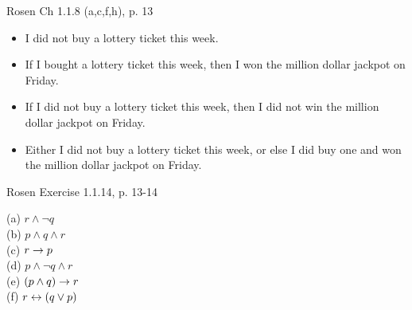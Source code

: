 \begin{questions}
  Rosen Ch 1.1.8 (a,c,f,h), p. 13 
    \ifprintanswers
        \vspace{-10pt}
    \fi
    \begin{solution}
        \begin{itemize}[itemsep=0pt,parsep=0pt,
        topsep=0pt,partopsep=0pt]
            \item[(a)] I did not buy a lottery ticket this week.
            \item[(c)] If I bought a lottery ticket this week, then I won the million dollar jackpot on Friday. 
            \item[(f)] If I did not buy a lottery ticket this week, then I did not win the million dollar jackpot on Friday. 
            \item[(h)] Either I did not buy a lottery ticket this week, or else I did buy one and won the million dollar jackpot on Friday.
        \end{itemize}
    \end{solution}




  Rosen Exercise 1.1.14, p. 13-14
    \ifprintanswers
        \vspace{-5pt}
    \fi
    \begin{solution}
        (a) $r \wedge \neg q$ \\
        (b) $p \wedge q \wedge r$ \\
        (c) $r \rightarrow p$ \\
        (d) $p \wedge \neg q \wedge r$ \\ 
        (e) $(p \wedge q) \rightarrow r$ \\
        (f) $r \leftrightarrow (q \vee p)$
    \end{solution}





\end{questions}
